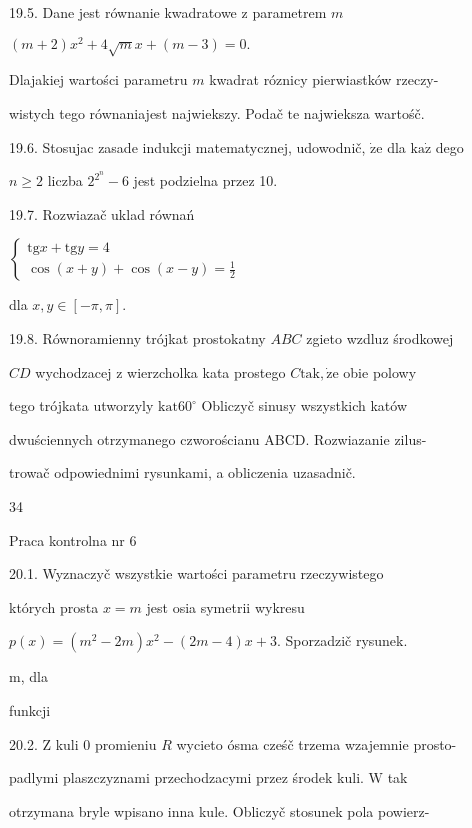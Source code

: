 \documentclass[a4paper,12pt]{article}
\begin{document}
19.5. Dane jest równanie kwadratowe $\mathrm{z}$ parametrem $m$

$(m+2)x^{2}+4\sqrt{m}x+(m-3)=0.$

Dlajakiej wartości parametru $m$ kwadrat róznicy pierwiastków rzeczy-

wistych tego równaniajest najwiekszy. Podač $\mathrm{t}\mathrm{e}$ najwieksza wartośč.

19.6. Stosujac zasade indukcji matematycznej, udowodnič, $\dot{\mathrm{z}}\mathrm{e}$ dla $\mathrm{k}\mathrm{a}\dot{\mathrm{z}}$ dego

$n\geq 2$ liczba $2^{2^{n}}-6$ jest podzielna przez 10.

19.7. Rozwiazač uklad równań

$\left\{\begin{array}{l}
\mathrm{t}\mathrm{g}x+\mathrm{t}\mathrm{g}y=4\\
\cos(x+y)+\cos(x-y)=\frac{1}{2}
\end{array}\right.$

dla $x, y\in[-\pi,\pi].$

19.8. Równoramienny trójkat prostokatny $ABC$ zgieto wzdluz środkowej

$CD$ wychodzacej $\mathrm{z}$ wierzcholka kata prostego $C\mathrm{t}\mathrm{a}\mathrm{k}, \dot{\mathrm{z}}\mathrm{e}$ obie polowy

tego trójkata utworzyly $\mathrm{k}\mathrm{a}\mathrm{t}60^{\circ}$ Obliczyč sinusy wszystkich katów

dwuściennych otrzymanego czworościanu ABCD. Rozwiazanie zilus-

trowač odpowiednimi rysunkami, a obliczenia uzasadnič.





34

Praca kontrolna nr 6

20.1. Wyznaczyč wszystkie wartości parametru rzeczywistego

których prosta $x = m$ jest osia symetrii wykresu

$p(x)=(m^{2}-2m)x^{2}-(2m-4)x+3$. Sporzadzič rysunek.

m, dla

funkcji

20.2. $\mathrm{Z}$ kuli $0$ promieniu $R$ wycieto ósma cześč trzema wzajemnie prosto-

padlymi plaszczyznami przechodzacymi przez środek kuli. $\mathrm{W}$ tak

otrzymana bryle wpisano inna kule. Obliczyč stosunek pola powierz-
\end{document}
